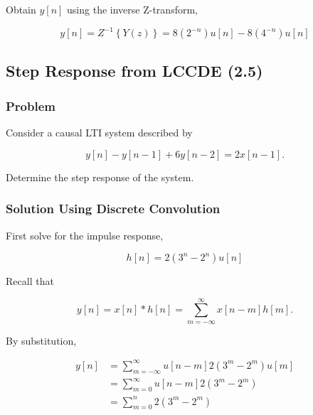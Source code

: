Obtain $y[n]$ using the inverse Z-transform,

\begin{equation}
    y[n] = {Z^{ - 1}}\left\{ {Y(z)} \right\} = 8\left( {{2^{ - n}}} \right)u[n] - 8\left( {{4^{ - n}}} \right)u[n]
\end{equation}

\subsection{Step Response from LCCDE (2.5)}

\subsubsection{Problem}

Consider a causal LTI system described by 

\begin{equation}
    y[n]  - y[n-1] + 6 y[n-2] = 2 x[n-1].
\end{equation}

Determine the step response of the system.

\subsubsection{Solution Using Discrete Convolution}

First solve for the impulse response,

\begin{equation}
    h[n] = 2 \left(3^n - 2^n \right) u[n]
\end{equation}

Recall that

\begin{equation}
    y[n] = x[n] * h[n] = \sum\limits_{m=-\infty}^{\infty} x[n - m] h[m].
\end{equation}

By substitution,

\begin{equation}
    \begin{aligned}
        y[n] &= \sum\limits_{m =  - \infty }^\infty  {u[n - m]2\left( {{3^m} - {2^m}} \right)u[m]} \\
         &= \sum\limits_{m = 0}^\infty  {u[n - m]2\left( {{3^m} - {2^m}} \right)} \\
         &= \sum\limits_{m = 0}^n {2\left( {{3^m} - {2^m}} \right)} 
        \end{aligned}
\end{equation}

